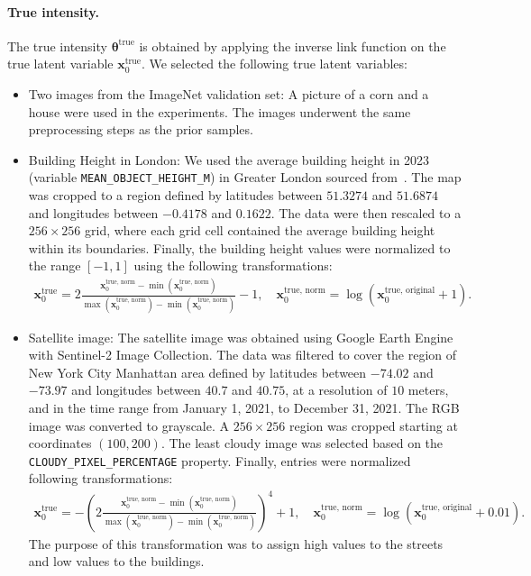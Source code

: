 \paragraph{True intensity.}
The true intensity $\boldsymbol{\theta}^{\text{true}}$ is obtained by applying the inverse link function on the true latent variable  $\mathbf{x}_0^{\text{true}}$. We selected the following true latent variables:
\begin{itemize}
    \item Two images from the ImageNet validation set: A picture of a corn and a house were used in the experiments. The images underwent the same preprocessing steps as the prior samples.
    \item Building Height in London: We used the average building height in 2023 (variable \texttt{MEAN\_OBJECT\_HEIGHT\_M}) in Greater London sourced from~\citet{LBSM}. The map was cropped to a region defined by latitudes between $51.3274$ and $51.6874$ and longitudes between $-0.4178$ and $0.1622$. The data were then rescaled to a $256 \times 256$ grid, where each grid cell contained the average building height within its boundaries. Finally, the building height values were normalized to the range $[-1, 1]$ using the following transformations:  
\begin{align*}
\mathbf{x}_0^{\text{true}} = 2  \frac{\mathbf{x}_0^{\text{true, norm}} - \min(\mathbf{x}_0^{\text{true, norm}})}{\max(\mathbf{x}_0^{\text{true, norm}}) - \min(\mathbf{x}_0^{\text{true, norm}})} - 1, \quad \mathbf{x}_0^{\text{true, norm}} = \log(\mathbf{x}_0^{\text{true, original}} + 1).
\end{align*}
\item Satellite image: The satellite image was obtained using Google Earth Engine with Sentinel-2 Image Collection. The data was filtered to cover the region of New York City Manhattan area defined by latitudes between $-74.02$ and $-73.97$ and longitudes between $40.7$ and $40.75$, at a resolution of $10$ meters, and in the time range from January 1, 2021, to December 31, 2021. The RGB image was converted to grayscale.
A $256\times256$ region was cropped starting at coordinates 
$(100,200)$. The least cloudy image was selected based on the \texttt{CLOUDY\_PIXEL\_PERCENTAGE} property.  Finally, entries were normalized following transformations:  
\begin{align*}
\mathbf{x}_0^{\text{true}} = -\left(2  \frac{\mathbf{x}_0^{\text{true, norm}} - \min(\mathbf{x}_0^{\text{true, norm}})}{\max(\mathbf{x}_0^{\text{true, norm}}) - \min(\mathbf{x}_0^{\text{true, norm}})}\right)^4 + 1, \quad \mathbf{x}_0^{\text{true, norm}} = \log(\mathbf{x}_0^{\text{true, original}} + 0.01).
\end{align*}
The purpose of this transformation was to assign high values to the streets and low values to the buildings.
\end{itemize}

